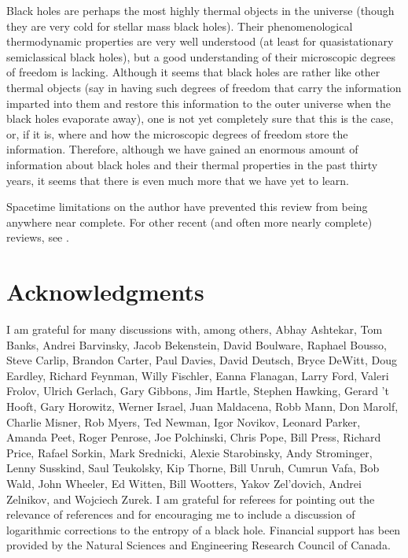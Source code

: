 \documentclass[12pt]{article} \usepackage{latexsym}
\begin{document}
Black holes are perhaps the most highly thermal objects in the
universe (though they are very cold for stellar mass black holes).
Their phenomenological thermodynamic properties are very well
understood (at least for quasistationary semiclassical black holes),
but a good understanding of their microscopic degrees of freedom is
lacking.  Although it seems that black holes are rather like other
thermal objects (say in having such degrees of freedom that carry the
information imparted into them and restore this information to the
outer universe when the black holes evaporate away), one is not yet
completely sure that this is the case, or, if it is, where and how the
microscopic degrees of freedom store the information.  Therefore,
although we have gained an enormous amount of information about black
holes and their thermal properties in the past thirty years, it seems
that there is even much more that we have yet to learn.

Spacetime limitations on the author have prevented this review from
being anywhere near complete.  For other recent (and often more nearly
complete) reviews, see
\cite{Frolov96,Wald97,Sor3,Jacobson97,FF,Mukohyama98,Kiefer99,
Jacobson99,Mukohyama99,Wald99,Majumdar0,Majumdar1,Kiefer02,
Israel03,Jacobson03,Damour,Das,Fursaev}.

\section*{Acknowledgments}

I am grateful for many discussions with, among others, Abhay Ashtekar,
Tom Banks, Andrei Barvinsky, Jacob Bekenstein, David Boulware, Raphael
Bousso, Steve Carlip, Brandon Carter, Paul Davies, David Deutsch, Bryce
DeWitt, Doug Eardley, Richard Feynman, Willy Fischler, Eanna Flanagan,
Larry Ford, Valeri Frolov, Ulrich Gerlach, Gary Gibbons, Jim Hartle,
Stephen Hawking, Gerard 't Hooft, Gary Horowitz, Werner Israel, Juan
Maldacena, Robb Mann, Don Marolf, Charlie Misner, Rob Myers, Ted
Newman, Igor Novikov, Leonard Parker, Amanda Peet, Roger Penrose, Joe
Polchinski, Chris Pope, Bill Press, Richard Price, Rafael Sorkin, Mark
Srednicki, Alexie Starobinsky, Andy Strominger, Lenny Susskind, Saul
Teukolsky, Kip Thorne, Bill Unruh, Cumrun Vafa, Bob Wald, John Wheeler,
Ed Witten, Bill Wootters, Yakov Zel'dovich, Andrei Zelnikov, and
Wojciech Zurek.  I am grateful for referees for pointing out the
relevance of references \cite{Par1,Par2,Par3,Par4,Full1,Full2} and for
encouraging me to include a discussion of logarithmic corrections to
the entropy of a black hole.  Financial support has been provided by
the Natural Sciences and Engineering Research Council of Canada.
\end{document}
